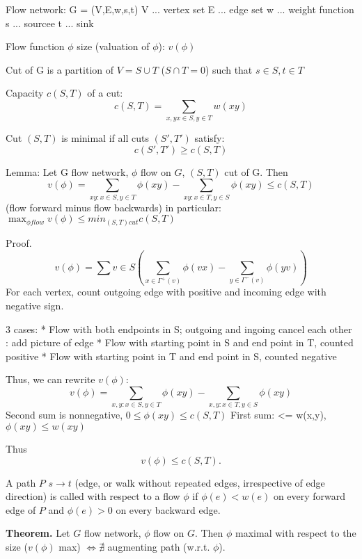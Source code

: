 
Flow network: G = (V,E,w,s,t)
V ... vertex set
E ... edge set
w ... weight function
s ... sourcee
t ... sink

Flow function $\phi$
size (valuation of $\phi$): $v(\phi)$


\begin{definition}
Cut of G is a partition of $V=S \cup T$ ($S\cap T=0$) such that
$s \in S,t \in T$
\end{definition}


Capacity $c(S,T)$ of a cut:
\[ c(S,T) = \sum_{x,y x\in S, y\in T} w(xy) \]

Cut $(S,T)$ is minimal if all cuts $(S',T')$ satisfy:
\[ c(S', T') \geq c(S,T) \]


Lemma: Let G flow network, $\phi$ flow on $G$, $(S,T)$ cut of G. Then
\[
v(\phi) = \sum_{xy: x\in S, y\in T} \phi(xy)
        - \sum_{xy: x\in T, y\in S} \phi(xy)
\leq c(S,T)
\]
(flow forward minus flow backwards)
in particular: $\max_{\phi flow} v(\phi)\leq min_{(S,T) cut} c(S,T)$

Proof.
\[
    v(\phi) = \sum{v\in S} (
        \sum_{x\in \Gamma^+(v)} \phi(vx)
      - \sum_{y\in \Gamma^-(v)} \phi(yv)
    )
\]
For each vertex, count outgoing edge with positive and incoming edge with negative sign.

3 cases:
* Flow with both endpoints in S; outgoing and ingoing cancel each other
    \TODO: add picture of edge
* Flow with starting point in S and end point in T, counted positive
* Flow with starting point in T and end point in S, counted negative

Thus, we can rewrite $v(\phi)$:
\[
    v(\phi) = \sum_{x,y: x\in S, y\in T} \phi(xy)
            - \sum_{x,y: x\in T, y\in S} \phi(xy)
\]
Second sum is nonnegative, $0 \leq \phi (xy) \leq c(S,T)$
First sum: <= w(x,y), $\phi (xy) \leq w(xy)$

Thus
\[
    v(\phi) \leq c(S,T).
\]



\begin{definition}
A path $P$ $s\rightarrow t$ (edge, or walk without repeated edges, irrespective of edge direction) is called  with respect to a flow $\phi$ if $\phi(e) < w(e)$ on every forward edge of $P$ and $\phi(e) > 0$ on every backward edge.
\end{definition}

\textbf{Theorem.}
Let $G$ flow network, $\phi$ flow on $G$. Then $\phi$ maximal with respect to the size ($v(\phi)$ max) $\Leftrightarrow \nexists$ augmenting path (w.r.t. $\phi$).

